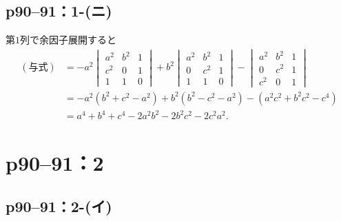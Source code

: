 \documentclass[a4paper,10pt,fleqn]{ltjsarticle}
\begin{document}
\newpage

\subsection*{p90--91：1-(ニ)}

\begin{tleftbar}
  第$1$列で余因子展開すると
  \begin{align*}
    (\text{与式}) & = -a^2\begin{vmatrix} a^2 & b^2 & 1 \\ c^2 & 0 & 1 \\ 1 & 1 & 0 \end{vmatrix}+b^2 \begin{vmatrix} a^2 & b^2 & 1 \\ 0 & c^2 & 1 \\ 1 & 1 & 0 \end{vmatrix} - \begin{vmatrix} a^2 & b^2 & 1 \\ 0 & c^2 & 1 \\ c^2 & 0 & 1 \end{vmatrix} \\
                & = -a^2 (b^2+c^2 -a^2) +b^2 (b^2-c^2-a^2)- (a^2c^2+b^2c^2-c^4)                                                                                                                                                                         \\
                & =a^4+b^4+c^4 -2a^2b^2 - 2b^2 c^2 -2c^2 a^2 .
  \end{align*}
\end{tleftbar}
\newpage


\section*{p90--91：2}

\subsection*{p90--91：2-(イ)}
\end{document}
